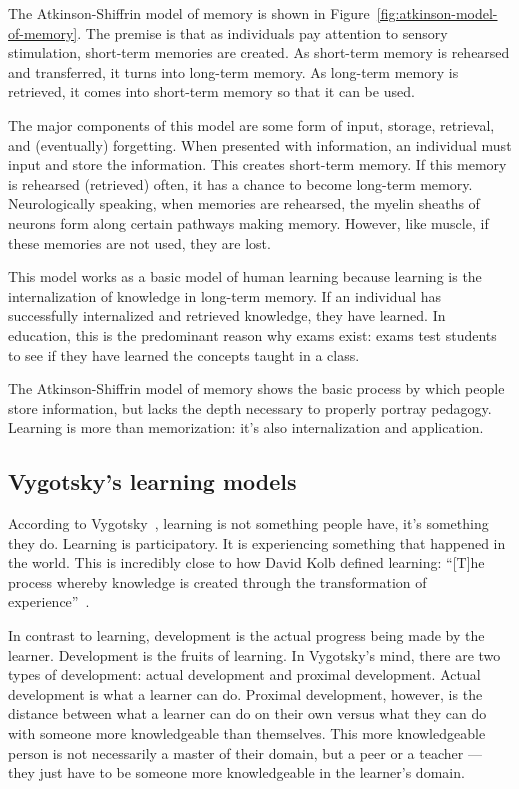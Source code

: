 The Atkinson-Shiffrin model of memory is shown in Figure~\ref{fig:atkinson-model-of-memory}. The premise is that as individuals pay attention to sensory stimulation, short-term memories are created. As short-term memory is rehearsed and transferred, it turns into long-term memory. As long-term memory is retrieved, it comes into short-term memory so that it can be used.

The major components of this model are some form of input, storage, retrieval, and (eventually) forgetting. When presented with information, an individual must input and store the information. This creates short-term memory. If this memory is rehearsed (retrieved) often, it has a chance to become long-term memory. Neurologically speaking, when memories are rehearsed, the myelin sheaths of neurons form along certain pathways making memory. However, like muscle, if these memories are not used, they are lost.

This model works as a basic model of human learning because learning is the internalization of knowledge in long-term memory. If an individual has successfully internalized and retrieved knowledge, they have learned. In education, this is the predominant reason why exams exist: exams test students to see if they have learned the concepts taught in a class.

The Atkinson-Shiffrin model of memory shows the basic process by which people store information, but lacks the depth necessary to properly portray pedagogy. Learning is more than memorization: it's also internalization and application.

\subsection{Vygotsky's learning models}
According to Vygotsky~\citep{vygotsky1978}, learning is not something people have, it's something they do. Learning is participatory. It is experiencing something that happened in the world. This is incredibly close to how David Kolb defined learning: ``[T]he process whereby knowledge is created through the transformation of experience''~\citep{kolb2013}.

In contrast to learning, development is the actual progress being made by the learner. Development is the fruits of learning. In Vygotsky's mind, there are two types of development: actual development and proximal development. Actual development is what a learner can do. Proximal development, however, is the distance between what a learner can do on their own versus what they can do with someone more knowledgeable than themselves. This more knowledgeable person is not necessarily a master of their domain, but a peer or a teacher — they just have to be someone more knowledgeable in the learner's domain.

